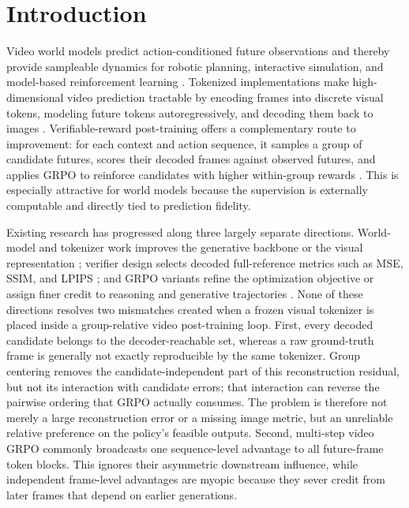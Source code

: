 \documentclass[letterpaper]{article} %
\begin{document}
\section{Introduction}

Video world models predict action-conditioned future observations and thereby provide sampleable dynamics for robotic planning, interactive simulation, and model-based reinforcement learning \citep{worldmodels,rssm,dreamerv3,dws}. Tokenized implementations make high-dimensional video prediction tractable by encoding frames into discrete visual tokens, modeling future tokens autoregressively, and decoding them back to images \citep{videogpt,magvit,ivideogpt,fsq}. Verifiable-reward post-training offers a complementary route to improvement: for each context and action sequence, it samples a group of candidate futures, scores their decoded frames against observed futures, and applies GRPO to reinforce candidates with higher within-group rewards \citep{rlvrworld,grpo}. This is especially attractive for world models because the supervision is externally computable and directly tied to prediction fidelity.

Existing research has progressed along three largely separate directions. World-model and tokenizer work improves the generative backbone or the visual representation \citep{vqvae,vqgan,fsq}; verifier design selects decoded full-reference metrics such as MSE, SSIM, and LPIPS \citep{ssim,lpips}; and GRPO variants refine the optimization objective or assign finer credit to reasoning and generative trajectories \citep{grpolambda,spo,sdgrpo,stepwiseflowgrpo,dapo}. None of these directions resolves two mismatches created when a frozen visual tokenizer is placed inside a group-relative video post-training loop. First, every decoded candidate belongs to the decoder-reachable set, whereas a raw ground-truth frame is generally not exactly reproducible by the same tokenizer. Group centering removes the candidate-independent part of this reconstruction residual, but not its interaction with candidate errors; that interaction can reverse the pairwise ordering that GRPO actually consumes. The problem is therefore not merely a large reconstruction error or a missing image metric, but an unreliable relative preference on the policy's feasible outputs. Second, multi-step video GRPO commonly broadcasts one sequence-level advantage to all future-frame token blocks. This ignores their asymmetric downstream influence, while independent frame-level advantages are myopic because they sever credit from later frames that depend on earlier generations.
\end{document}
